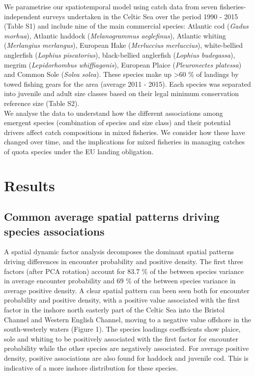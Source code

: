 \documentclass[fleqn,10pt]{wlscirep}
\begin{document}
\begin{linenumbers}
We parametrise our spatiotemporal model using catch data from seven
fisheries-independent surveys undertaken in the Celtic Sea over the period 1990
- 2015 (Table S1) and include nine of the main commercial species: Atlantic cod
(\textit{Gadus morhua}), Atlantic haddock (\textit{Melanogrammus aeglefinus}),
Atlantic whiting (\textit{Merlangius merlangus}), European Hake
(\textit{Merluccius merluccius}), white-bellied anglerfish (\textit{Lophius
	piscatorius}), black-bellied anglerfish (\textit{Lophius budegassa}),
megrim (\textit{Lepidorhombus whiffiagonis}), European Plaice
(\textit{Pleuronectes platessa}) and Common Sole (\textit{Solea solea}). These
species make up \textgreater 60 \% of landings by towed fishing gears for the
area (average 2011 - 2015\cite{STECF2017}). Each species was separated into
juvenile and adult size classes based on their legal minimum conservation
reference size (Table S2).\\

We analyse the data to understand how the different associations among emergent
species (combination of species and size class) and their
potential drivers affect catch compositions in mixed fisheries. We consider how
these have changed over time, and the implications for mixed fisheries in
managing catches of quota species under the EU landing obligation.\\


\section*{Results\\}

\subsection*{Common average spatial patterns driving species associations\\} A
spatial dynamic factor analysis decomposes the dominant spatial patterns
driving differences in encounter probability and positive density. The first
three factors (after PCA rotation) account for 83.7 \% of the between
species variance in average encounter probability and 69 \% of the
between species variance in average positive density. A clear spatial
pattern can been seen both for encounter probability and positive density, with
a positive value associated with the first factor in the inshore north easterly
part of the Celtic Sea into the Bristol Channel and Western English Channel,
moving to a negative value offshore in the south-westerly waters (Figure 1).
The species loadings coefficients show plaice, sole and whiting to be
positively associated with the first factor for encounter probability while the
other species are negatively associated. For average positive density,
positive associations are also found for haddock and juvenile cod. This is
indicative of a more inshore distribution for these species.\\ 


\end{linenumbers}
\end{document}
